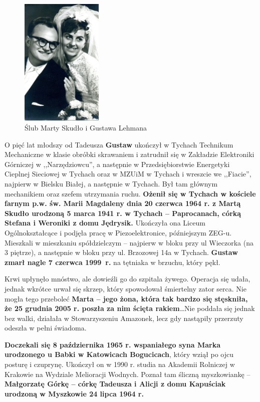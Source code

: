 \begin{figure}[!h]
\begin{center}
\includegraphics[width=0.35\textwidth]{photo/gustaw_marta_lehman_slub.jpg}
\caption{Ślub Marty Skudło i Gustawa Lehmana}
\label{rys:gustaw_marta_lehman_slub}
\end{center}
\end{figure}

O pięć lat młodszy od Tadeusza \textbf{Gustaw} ukończył w Tychach Technikum Mechaniczne w klasie obróbki skrawaniem i zatrudnił się w Zakładzie Elektroniki Górniczej w ,,Narzędziowcu'', a następnie w Przedsiębiorstwie Energetyki Cieplnej Sieciowej w Tychach oraz w MZUiM w Tychach i wreszcie we ,,Fiacie'', najpierw w Bielsku Białej, a następnie w Tychach. Był tam głównym mechanikiem oraz szefem utrzymania ruchu. \textbf{Ożenił się w Tychach w kościele farnym p.w. św. Marii Magdaleny dnia 20 czerwca 1964 r. z Martą Skudło urodzoną 5 marca 1941 r. w Tychach -- Paprocanach, córką Stefana i Weroniki z domu Jędrysik.} Ukończyła ona Liceum Ogólnokształcące i podjęła pracę w Piezoelektronice, późniejszym ZEG-u. Mieszkali w mieszkaniu spółdzielczym -- najpierw w bloku przy ul Wieczorka (na 3 piętrze), a następnie w bloku przy ul. Brzozowej 14a w Tychach. \textbf{Gustaw zmarł nagle 7 czerwca 1999~r.} na tętniaka w brzuchu, który pękł.

Krwi upłynęło mnóstwo, ale dowieźli go do szpitala żywego. Operacja się udała, jednak wkrótce urwał się skrzep, który spowodował śmiertelny zator serca. Nie mogła tego przeboleć \textbf{Marta -- jego żona, która tak bardzo się stęskniła, że 25 grudnia 2005 r. poszła za nim ścięta rakiem}\ldots Nie poddała się jednak bez walki, działała w Stowarzyszeniu Amazonek, lecz gdy nastąpiły przerzuty odeszła w pełni świadoma.

\textbf{Doczekali się 8 października 1965 r. wspaniałego syna Marka urodzonego u Babki w Katowicach Bogucicach}, który wziął po ojcu posturę i czuprynę. Ukończył on w 1990 r. studia na Akademii Rolniczej w Krakowie na Wydziale Melioracji Wodnych. Poznał tam śliczną myszkowiankę -- \textbf{Małgorzatę Górkę -- córkę Tadeusza i Alicji z domu Kapuściak urodzoną w Myszkowie 24 lipca 1964 r.}

